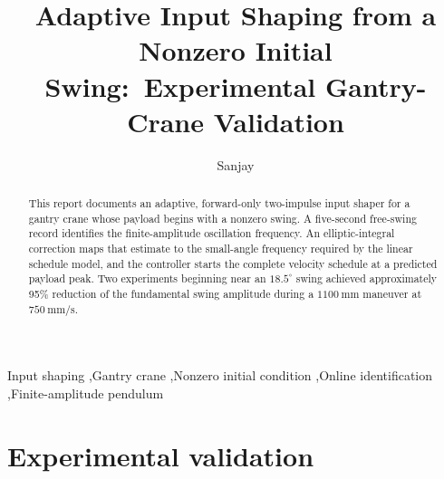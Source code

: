 \documentclass[3p]{elsarticle}
\begin{document}
\begin{frontmatter}
\title{Adaptive Input Shaping from a Nonzero Initial Swing:\ Experimental Gantry-Crane Validation}
\author{Sanjay}
\begin{abstract}
This report documents an adaptive, forward-only two-impulse input shaper for
a gantry crane whose payload begins with a nonzero swing.  A five-second
free-swing record identifies the finite-amplitude oscillation frequency.  An
elliptic-integral correction maps that estimate to the small-angle frequency
required by the linear schedule model, and the controller starts the complete
velocity schedule at a predicted payload peak.  Two experiments beginning
near an $18.5^{\circ}$ swing achieved approximately 95\% reduction of the
fundamental swing amplitude during a $1100~\mathrm{mm}$ maneuver at
$750~\mathrm{mm/s}$.
\end{abstract}
\begin{keyword}
Input shaping \sep Gantry crane \sep Nonzero initial condition \sep Online identification \sep Finite-amplitude pendulum
\end{keyword}
\end{frontmatter}

\section{Experimental validation}

\end{document}
